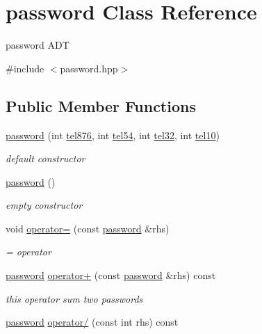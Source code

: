 \hypertarget{classpassword}{}\section{password Class Reference}
\label{classpassword}


password A\+DT  




{\ttfamily \#include $<$password.\+hpp$>$}

\subsection*{Public Member Functions}
\begin{DoxyCompactItemize}
\item 
\hyperlink{classpassword_a73408df5e3c516dfe53b968ac700d18d}{password} (int \hyperlink{classpassword_a0e2e6d171003a3a8594a2cfec2b9c059}{tel876}, int \hyperlink{classpassword_ad5afb40aeb150953f66a1c14745297bc}{tel54}, int \hyperlink{classpassword_a93ef3ccb4e71a683115c12435c89411d}{tel32}, int \hyperlink{classpassword_af09c363ed2ec22c8e900fdd6bf66c1f6}{tel10})
\begin{DoxyCompactList}\small\item\em default constructor \end{DoxyCompactList}\item 
\hyperlink{classpassword_aa9dba4c6670c6e2e848b16f036865c54}{password} ()
\begin{DoxyCompactList}\small\item\em empty constructor \end{DoxyCompactList}\item 
void \hyperlink{classpassword_a107a4017891e000323e7300b0d67ba20}{operator=} (const \hyperlink{classpassword}{password} \&rhs)
\begin{DoxyCompactList}\small\item\em = operator \end{DoxyCompactList}\item 
\hyperlink{classpassword}{password} \hyperlink{classpassword_a319c42d6fcfe0f7e36999a00a6bdd4a0}{operator+} (const \hyperlink{classpassword}{password} \&rhs) const 
\begin{DoxyCompactList}\small\item\em this operator sum two passwords \end{DoxyCompactList}\item 
\hyperlink{classpassword}{password} \hyperlink{classpassword_a1d15ab4bff819d61b48b0b2835b40afa}{operator/} (const int rhs) const 

\end{DoxyCompactItemize}
